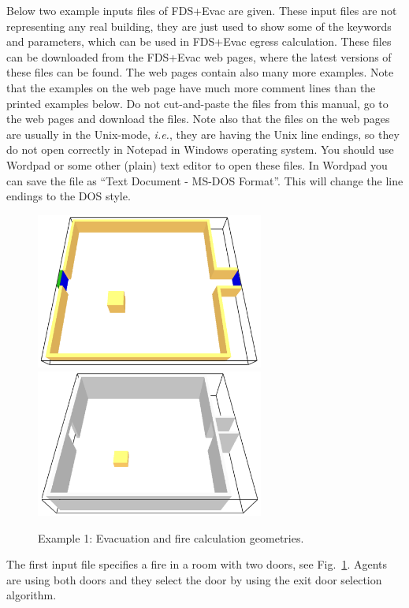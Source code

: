 \documentclass[12pt,a4paper,final,twoside]{stylevk}
\begin{document}
\noindent Below two example inputs files of FDS+Evac are given.  These
input files are not representing any real building, they are just used
to show some of the keywords and parameters, which can be used in
FDS+Evac egress calculation.  These files can be downloaded from the
FDS+Evac web pages, where the latest versions of these files can be
found.  The web pages contain also many more examples.  Note that the
examples on the web page have much more comment lines than the printed
examples below.  Do not cut-and-paste the files from this manual, go
to the web pages and download the files.  Note also that the files on
the web pages are usually in the Unix-mode, \emph{i.e.}, they are
having the Unix line endings, so they do not open correctly in Notepad
in Windows operating system.  You should use Wordpad or some other
(plain) text editor to open these files.  In Wordpad you can save the
file as ``Text Document - MS-DOS Format''.  This will change the line
endings to the DOS style.


\begin{figure}[!b]
  \centerline{\includegraphics[clip=true,
    width=75mm]{FIGURES/evac_example1_EvacGeom} \includegraphics[clip=true,
    width=75mm]{FIGURES/evac_example1_FireGeom}}
  \caption{Example 1: Evacuation and fire calculation
    geometries.}\label{Fig_Ex1EvacGeom}
\end{figure}


The first input file specifies a fire in a room with two doors, see
Fig.~\ref{Fig_Ex1EvacGeom}.  Agents are using both doors and they
select the door by using the exit door selection algorithm.
\vspace{\fill}
\end{document}
